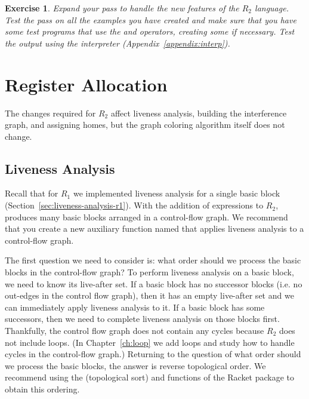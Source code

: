 \documentclass[11pt]{book}
\newtheorem{exercise}[theorem]{Exercise}
\begin{document}
\begin{exercise}\normalfont
Expand your  pass to handle the new features
of the $R_2$ language. Test the pass on all the examples you have
created and make sure that you have some test programs that use the
 and \code{<} operators, creating some if necessary. Test
the output using the  interpreter
(Appendix~\ref{appendix:interp}).
\end{exercise}

\section{Register Allocation}
\label{sec:register-allocation-r2}

The changes required for $R_2$ affect liveness analysis, building the
interference graph, and assigning homes, but the graph coloring
algorithm itself does not change.

\subsection{Liveness Analysis}
\label{sec:liveness-analysis-r2}

Recall that for $R_1$ we implemented liveness analysis for a single
basic block (Section~\ref{sec:liveness-analysis-r1}). With the
addition of  expressions to $R_2$, 
produces many basic blocks arranged in a control-flow graph.  We
recommend that you create a new auxiliary function named
 that applies liveness analysis to a
control-flow graph.

The first question we need to consider is: what order should we
process the basic blocks in the control-flow graph? To perform
liveness analysis on a basic block, we need to know its live-after
set. If a basic block has no successor blocks (i.e. no out-edges in
the control flow graph), then it has an empty live-after set and we
can immediately apply liveness analysis to it. If a basic block has
some successors, then we need to complete liveness analysis on those
blocks first. Thankfully, the control flow graph does not contain any
cycles because $R_2$ does not include loops.  (In
Chapter~\ref{ch:loop} we add loops and study how to handle cycles in
the control-flow graph.)
%
Returning to the question of what order should we process the basic
blocks, the answer is reverse topological order. We recommend using
the  (topological sort) and  functions of
the Racket  package to obtain this ordering.
\end{document}
